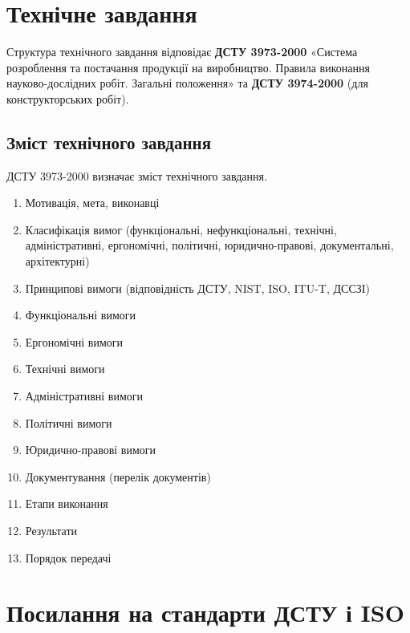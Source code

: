 \documentclass{article}
\begin{document}
\newpage
\section{Технічне завдання}
Структура технічного завдання відповідає \textbf{ДСТУ 3973-2000} «Система розроблення та постачання
продукції на виробництво. Правила виконання науково-дослідних робіт. Загальні
положення» та \textbf{ДСТУ 3974-2000} (для конструкторських робіт).

\subsection{Зміст технічного завдання}
ДСТУ 3973-2000 визначає зміст технічного завдання.

\begin{enumerate}
\item Мотивація, мета, виконавці
\item Класифікація вимог (функціональні, нефункціональні, технічні, адміністративні, ергономічні, політичні, юридично-правові, документальні, архітектурні)
\item Принципові вимоги (відповідність ДСТУ, NIST, ISO, ITU-T, ДССЗІ)
\item Функціональні вимоги
\item Ергономічні вимоги
\item Технічні вимоги
\item Адміністративні вимоги
\item Політичні вимоги
\item Юридично-правові вимоги
\item Документування (перелік документів)
\item Етапи виконання
\item Результати
\item Порядок передачі
\end{enumerate}

\newpage
\section{Посилання на стандарти ДСТУ і ISO}
\end{document}
